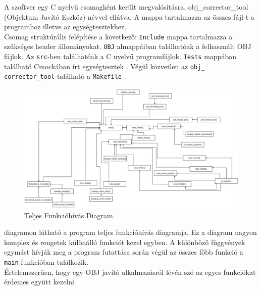 A szoftver egy C nyelvű csomagként került megvalósításra, obj\_corrector\_tool (Objektum Javító Eszköz) névvel ellátva. A mappa tartalmazza az összes fájl-t a programhoz illetve az egységtesztekhez.\\

Csomag struktúrális felépítése a következő:
\bigskip
{}
\newpage
\texttt{Include} mappa tartalmazza a szükséges header állományokat.  \texttt{OBJ} almappáiban találhatóak a felhasznált OBJ fájlok. Az \texttt{src}-ben találhatóak a C nyelvű programfájlok. \texttt{Tests} mappában található Cmockában írt egységtesztek . Végül közvetlen az \texttt{obj\_\\corrector\_tool} található a \texttt{Makefile} .\\

\bigskip
\begin{figure}[h]
\centering
\includegraphics[width=\textwidth]{images/func.png}
\caption{Teljes Funkcióhívás Diagram.}
\label{fig:funk}
\end{figure}
\bigskip
{} diagramon látható a program teljes funkcióhívás diagramja. Ez a diagram nagyon komplex és rengetek különálló funkciót kezel egyben. A különböző függvények egymást hívják meg a program futattása során végül az összes főbb funkció a \texttt{main} funkcióban találkozik.\\

Értelemszerűen, hogy egy OBJ javító alkalmazásról lévén szó az egyes funkciókat érdemes együtt  kezelni\\

